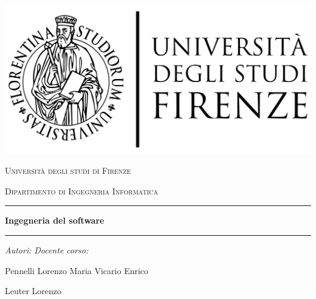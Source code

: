 \documentclass[10pt]{article}
\begin{document}
\par\medskip
\begin{center}
\includegraphics[scale=0.1,center]{unifilogo/firenze2}
\end{center}

\begin{center}
\par\medskip
\textsc{{\large Università degli studi di Firenze}}\\
\par\medskip
\textsc{{\normalsize Dipartimento di Ingegneria Informatica}}\\
\par\medskip
\par\medskip
\hrule width 12cm height 1pt \par
\par\medskip
\par\medskip
\par\medskip
{\Large \textbf{Ingegneria del software}}\\
\par\medskip
\par\medskip
\par\medskip
\hrule width 12cm height 1pt \par
\par\medskip
\par\medskip
\par\medskip
\emph{Autori:} \hfill \emph{Docente corso:}\\
\par\medskip
Pennelli Lorenzo Maria \hfill Vicario Enrico\\
\begin{FlushLeft}
Leuter Lorenzo\\
\end{FlushLeft}

\end{center}

\newpage
\end{document}
